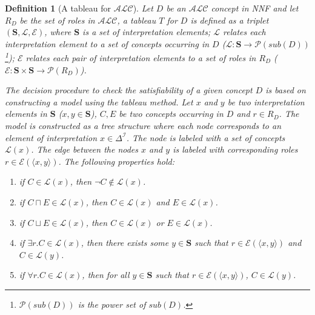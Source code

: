 \documentclass{article}
\newtheorem{mydef}{Definition}
\begin{document}
\begin{mydef}[A tableau for $\mathcal{ALC}$] \label{def:tableauALC}
Let $D$ be an $\mathcal{ALC}$ concept in NNF and let $R_D$ be the set of roles in $\mathcal{ALC}$, a tableau $T$ for $D$ is defined as a triplet $(\mathbf{S},\mathcal{L}, \mathcal{E})$, 
where $\mathbf{S}$ is a set of interpretation elements;
$\mathcal{L}$ relates each interpretation element to a set of concepts occurring in $D$ ($\mathcal{L}:\mathbf{S}\rightarrow\mathcal{P}(sub(D))$
\footnote{$\mathcal{P}(sub(D))$ is the power set of $sub(D)$.});  
$\mathcal{E}$ relates each pair of interpretation elements to a set of roles in $R_D$  ($\mathcal{E}:\mathbf{S}\times\mathbf{S}\rightarrow \mathcal{P}(R_D)$). 

The decision procedure to check the satisfiability of a given concept $D$ is based on constructing a model using the tableau method. 
Let $x$ and $y$ be two interpretation elements in $\mathbf{S}$ ($x,y\in \mathbf{S}$), $C,E$ be two concepts occurring in $D$ and $r\in R_D$.
The model is constructed as a tree structure where each node corresponds to an element of interpretation $x\in \Delta^\mathcal{I}$.
The node is labeled with a set of concepts $\mathcal{L}(x)$.
The edge between the nodes $x$ and $y$ is labeled with corresponding roles $r\in\mathcal{E}(\langle x,y \rangle)$.
The following properties hold:
\begin{enumerate}
\item if $C\in \mathcal{L}(x)$, then $\neg C\notin\mathcal{L}(x)$.
\item if $C\sqcap E\in \mathcal{L}(x)$, then $ C\in\mathcal{L}(x)$ and $ E\in\mathcal{L}(x)$.
\item if $C\sqcup E\in \mathcal{L}(x)$, then $ C\in\mathcal{L}(x)$ or $ E\in\mathcal{L}(x)$.
\item if $\exists r.C\in \mathcal{L}(x)$, then there exists some $y\in \mathbf{S}$  such that $r \in \mathcal{E}(\langle x,y\rangle)$ and $C\in\mathcal{L}(y)$.
\item if $\forall r.C\in \mathcal{L}(x)$, then for all $y \in \mathbf{S}$ such that $r \in \mathcal{E}(\langle x,y\rangle)$, $C\in\mathcal{L}(y)$.
\end{enumerate}
\end{mydef}
\end{document}
